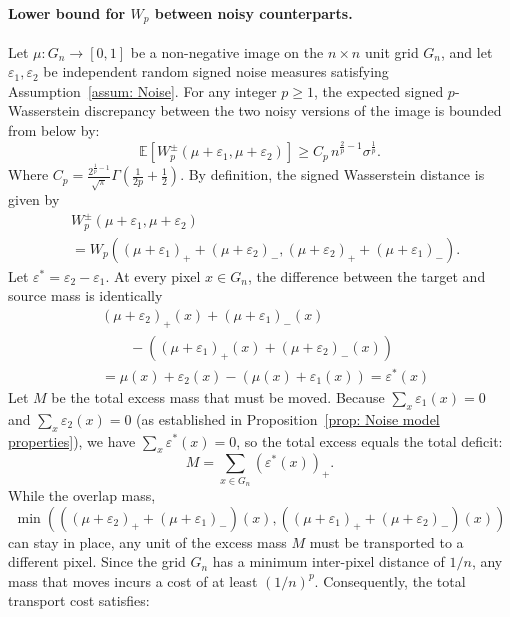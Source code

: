 \documentclass{article}
\theoremstyle{plain}
\theoremstyle{definition}
\theoremstyle{remark}
\newcommand{\E}{\mathbb{E}}
\begin{document}
\paragraph{Lower bound for $W_p$ between noisy counterparts.}
Let $\mu:G_n \to [0,1]$ be a non-negative image on the $n \times n$ unit grid $G_n$, and let $\varepsilon_1, \varepsilon_2$ be independent random signed noise measures satisfying Assumption~\ref{assum: Noise}. For any integer $p \ge 1$, the expected signed $p$-Wasserstein discrepancy between the two noisy versions of the image is bounded from below by:
\begin{equation}
    \E \left[ W_p^\pm(\mu+\varepsilon_1, \mu+\varepsilon_2) \right] 
    \ge C_p^{} \, n^{\frac{2}{p}-1} \sigma^{\frac{1}{p}}.
\end{equation}
Where $C_p=\frac{2^{\frac{1}{p}-1}}{\sqrt{\pi}} \Gamma\left(\frac{1}{2p} + \frac{1}{2}\right)$.\newline
By definition, the signed Wasserstein distance is given by 
\begin{align*}
    &W_p^\pm(\mu+\varepsilon_1, \mu+\varepsilon_2) \\
    &= W_p((\mu+\varepsilon_1)_+ + (\mu+\varepsilon_2)_-, (\mu+\varepsilon_2)_+ + (\mu+\varepsilon_1)_-).
\end{align*} 
Let $\varepsilon^* = \varepsilon_2 - \varepsilon_1$. At every pixel $x \in G_n$, the difference between the target and source mass is identically 
\begin{align*}
    &(\mu+\varepsilon_2)_+(x) + (\mu+\varepsilon_1)_-(x) \\
    &\qquad- ((\mu+\varepsilon_1)_+(x) + (\mu+\varepsilon_2)_-(x))\\ 
    &= \mu(x) + \varepsilon_2(x) - (\mu(x) + \varepsilon_1(x)) 
    = \varepsilon^*(x)
\end{align*}
Let $M$ be the total excess mass that must be moved. Because $\sum_x \varepsilon_1(x) = 0$ and $\sum_x \varepsilon_2(x) = 0$ (as established in Proposition~\ref{prop: Noise model properties}), we have $\sum_x \varepsilon^*(x) = 0$, so the total excess equals the total deficit:
\begin{equation}
    M = \sum_{x \in G_n} (\varepsilon^*(x))_+.
\end{equation}
While the overlap mass, $$\min(((\mu+\varepsilon_2)_+ + (\mu+\varepsilon_1)_-)(x), ((\mu+\varepsilon_1)_+ + (\mu+\varepsilon_2)_-)(x))$$ can stay in place, any unit of the excess mass $M$ must be transported to a different pixel. Since the grid $G_n$ has a minimum inter-pixel distance of $1/n$, any mass that moves incurs a cost of at least $(1/n)^p$. Consequently, the total transport cost satisfies:
\end{document}
